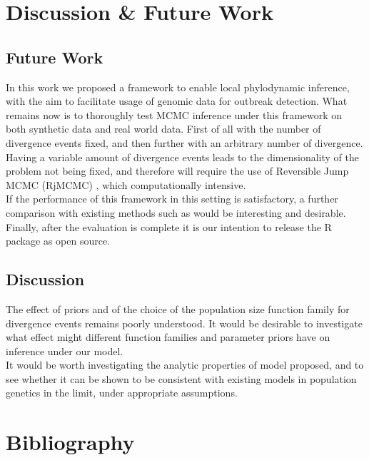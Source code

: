 \documentclass{report}
\theoremstyle{definition}
\begin{document}
\chapter{Discussion \& Future Work}
\section{Future Work}
In this work we proposed a framework to enable local phylodynamic inference, with the aim to facilitate usage of genomic data for outbreak detection. What remains now is to thoroughly test MCMC inference under this framework on both synthetic data and real world data. First of all with the number of divergence events fixed, and then further with an arbitrary number of divergence.\\
Having a variable amount of divergence events leads to the dimensionality of the problem not being fixed, and therefore will require the use of Reversible Jump MCMC (RjMCMC) \cite{green_reversible_1995, fan_reversible_2010}, which computationally intensive.\\
If the performance of this framework in this setting is satisfactory, a further comparison with existing methods such as \cite{volz_identification_nodate,barido-sottani_multitype_2020} would be interesting and desirable.\\
Finally, after the evaluation is complete it is our intention to release the R package as open source.
\section{Discussion}
The effect of priors and of the choice of the population size function family for divergence events remains poorly understood. It would be desirable to investigate what effect might different function families and parameter priors have on inference under our model.\\
It would be worth investigating the analytic properties of model proposed, and to see whether it can be shown to be consistent with existing models in population genetics in the limit, under appropriate assumptions.
\newpage
\chapter{Bibliography}
\printbibliography
\end{document}
